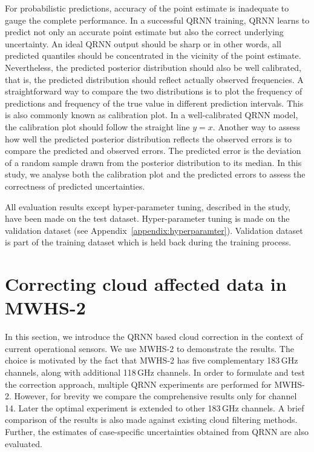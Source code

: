 \documentclass[amt, manuscript]{copernicus}
\begin{document}
For probabilistic predictions, accuracy of the point estimate is inadequate to
gauge the complete performance. In a successful QRNN training, QRNN learns to
predict not only an accurate point estimate but also the correct underlying
uncertainty. An ideal QRNN output should be sharp or in other words, all
predicted quantiles should be concentrated in the vicinity of the point
estimate. Nevertheless, the predicted posterior distribution should also be
well calibrated, that is, the predicted distribution should reflect actually
observed frequencies. A straightforward way to compare the two distributions is
to plot the frequency of predictions and frequency of the true value in
different prediction intervals. This is also commonly known as calibration plot.
In a well-calibrated QRNN model, the calibration plot should follow the straight
line $y = x$. Another way to assess how well the predicted posterior distribution
reflects the observed errors is to compare the predicted and observed errors.
The predicted error is the deviation of a random sample drawn from the posterior
distribution to its median. In this study, we analyse both the calibration plot
and the predicted errors to assess the correctness of predicted uncertainties.  

All evaluation results except hyper-parameter tuning, described in the study, have been made on the test dataset. Hyper-parameter tuning is made on the validation dataset (see Appendix~\ref{appendix:hyperparamter}). Validation dataset is part of the training dataset which is held back during the training process.


\section{Correcting cloud affected data in MWHS-2}
\label{qrnn_mwhs}
%
In this section, we introduce the QRNN based cloud correction in the context of current operational sensors.  We use MWHS-2 to demonstrate the results. The choice is motivated by the fact that MWHS-2 has five complementary 183\,GHz channels, along with additional 118\,GHz channels. In order to formulate and test the correction approach, multiple QRNN experiments are performed for MWHS-2. However, for brevity we compare the comprehensive results only for channel 14. Later the optimal experiment is extended to other 183\,GHz channels. A brief comparison of the results is also made against existing cloud filtering methods. Further, the estimates of case-specific uncertainties obtained from QRNN are also evaluated.
\end{document}
